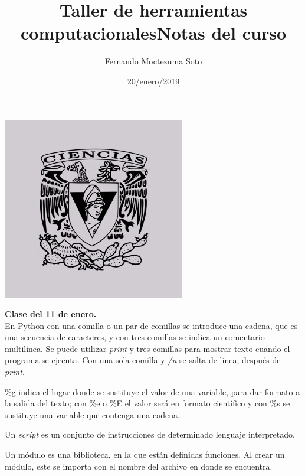 \documentclass[etterpaper, 12pt, oneside]{article}%
\title{\Huge Taller de herramientas computacionales}
\author{Fernando Moctezuma Soto}
\date{20/enero/2019}
\begin{document}
	\maketitle
	
	\begin{center}
		\includegraphics[scale=0.40]{1.jpg}
	\end{center}
	
	\newpage
	
	\title{\Huge Notas del curso\\}
	
	\textbf{Clase del 11 de enero.}\\
	
	
	En Python con una comilla o un par de comillas se introduce una cadena, que es una secuencia de caracteres, y con tres comillas se indica un comentario multilínea. Se puede utilizar \emph{print} y tres comillas para mostrar texto cuando el programa se ejecuta. Con una sola comilla y \emph{/n} se salta de línea, después de \emph{print}.
	
	\%g indica el lugar donde se sustituye el valor de una variable, para dar formato a la salida del texto; con \%e o \%E el valor será en formato científico y con \%s se sustituye una variable que contenga una cadena.
	
	Un \emph{script} es un conjunto de instrucciones de determinado lenguaje interpretado.
	
	Un módulo es una biblioteca, en la que están definidas funciones. Al crear un módulo, este se importa con el nombre del archivo en donde se encuentra.


	
	

	

	
\end{document}

